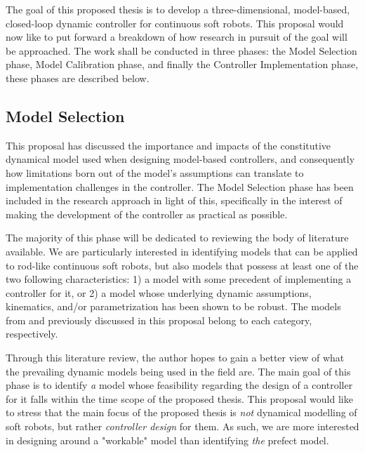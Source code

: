  The goal of this proposed thesis is to develop a three-dimensional, model-based, closed-loop dynamic controller for continuous soft robots. This proposal would now like to put forward a breakdown of how research in pursuit of the goal will be approached. The work shall be conducted in three phases: the Model Selection phase, Model Calibration phase, and finally the Controller Implementation phase, these phases are described below.   
\subsection{Model Selection}
This proposal has discussed the importance and impacts of the constitutive dynamical model used when designing model-based controllers, and consequently how limitations born out of the model's assumptions can translate to implementation challenges in the controller. The Model Selection phase has been included in the research approach in light of this, specifically in the interest of making the development of the controller as practical as possible.

The majority of this phase will be dedicated to reviewing the body of literature available. We are particularly interested in identifying models that can be applied to rod-like continuous soft robots, but also models that possess at least one of the two following characteristics: 1) a model with some precedent of implementing a controller for it, or 2) a model whose underlying dynamic assumptions, kinematics, and/or parametrization has been shown to be robust. The models from \cite{della_santina_model-based_2020} and \cite{della_santina_improved_2020} previously discussed in this proposal belong to each category, respectively. 

Through this literature review, the author hopes to gain a better view of what the prevailing dynamic models being used in the field are. The main goal of this phase is to identify \textit{a} model whose feasibility regarding the design of a controller for it falls within the time scope of the proposed thesis. This proposal would like to stress that the main focus of the proposed thesis is \textit{not} dynamical modelling of soft robots, but rather \textit{controller design} for them. As such, we are more interested in designing around a "workable" model than identifying \textit{the} prefect model.    
